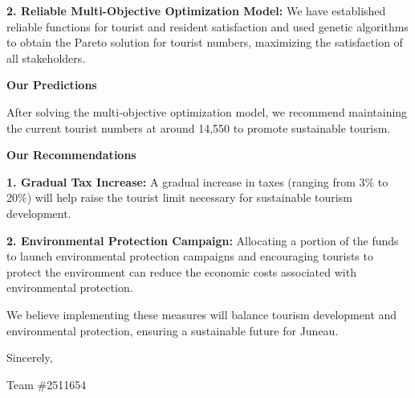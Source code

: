 \documentclass[12pt]{article}  %
\begin{document}
\textbf{2. Reliable Multi-Objective Optimization Model:} We have established reliable functions for tourist and resident satisfaction and used genetic algorithms to obtain the Pareto solution for tourist numbers, maximizing the satisfaction of all stakeholders.

\noindent
\textbf{Our Predictions}

After solving the multi-objective optimization model, we recommend maintaining the current tourist numbers at around 14,550 to promote sustainable tourism.

\noindent
\textbf{Our Recommendations}

\textbf{1. Gradual Tax Increase: }A gradual increase in taxes (ranging from 3\% to 20\%) will help raise the tourist limit necessary for sustainable tourism development.

\textbf{2. Environmental Protection Campaign: }Allocating a portion of the funds to launch environmental protection campaigns and encouraging tourists to protect the environment can reduce the economic costs associated with environmental protection.

We believe implementing these measures will balance tourism development and environmental protection, ensuring a sustainable future for Juneau.

\noindent Sincerely,

\noindent Team \#2511654
%


 \clearpage   %
 
\end{document}

